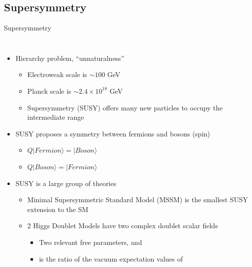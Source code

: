 \documentclass[aspectratio=169,xcolor=table]{beamer}
\begin{document}
  \subsection{Supersymmetry }

    \begin{frame}[t]{Supersymmetry}
      \begin{columns}
        \begin{itemize}
          \item Hierarchy problem, ``unnaturalness''
          \begin{itemize}
            \item Electroweak scale is $\sim 100$ GeV
            \item Planck scale is $\sim 2.4 \times 10^{18}$ GeV
            \item Supersymmetry (SUSY) offers many new particles to occupy the intermediate range
          \end{itemize}
          \item SUSY proposes a symmetry between fermions and bosons (spin)
          \begin{itemize}
            \item $Q | Fermion \rangle = | Boson \rangle$ 
            \item $Q | Boson \rangle = | Fermion \rangle$
          \end{itemize}
          \item SUSY is a large group of theories
          \begin{itemize}
            \item Minimal Supersymmetric Standard Model (MSSM) is the smallest SUSY extension to the SM
            \item 2 Higgs Doublet Models have two complex doublet scalar fields
            \begin{itemize}
              \item Two relevant free parameters, \tanb and \mHpm
              \item \tanb is the ratio of the vacuum expectation values of \Hpm
            \end{itemize}
          \end{itemize}
        \end{itemize}
        \begin{table}[!thp]
          \centering
          \resizebox{\textwidth}{!}{
}
\end{table}
\end{columns}
\end{frame}
\end{document}
